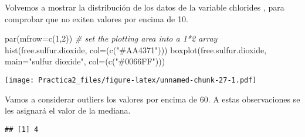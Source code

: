 \documentclass[
]{article}
\newenvironment{Shaded}{\begin{snugshade}}{\end{snugshade}}
\newcommand{\AttributeTok}[1]{\textcolor[rgb]{0.77,0.63,0.00}{#1}}
\newcommand{\CommentTok}[1]{\textcolor[rgb]{0.56,0.35,0.01}{\textit{#1}}}
\newcommand{\ConstantTok}[1]{\textcolor[rgb]{0.00,0.00,0.00}{#1}}
\newcommand{\ControlFlowTok}[1]{\textcolor[rgb]{0.13,0.29,0.53}{\textbf{#1}}}
\newcommand{\DecValTok}[1]{\textcolor[rgb]{0.00,0.00,0.81}{#1}}
\newcommand{\FunctionTok}[1]{\textcolor[rgb]{0.00,0.00,0.00}{#1}}
\newcommand{\NormalTok}[1]{#1}
\newcommand{\OtherTok}[1]{\textcolor[rgb]{0.56,0.35,0.01}{#1}}
\newcommand{\SpecialCharTok}[1]{\textcolor[rgb]{0.00,0.00,0.00}{#1}}
\newcommand{\StringTok}[1]{\textcolor[rgb]{0.31,0.60,0.02}{#1}}
\begin{document}
Volvemos a mostrar la distribución de los datos de la variable chlorides
, para comprobar que no exiten valores por encima de 10.

\begin{Shaded}
\begin{Highlighting}[]
\FunctionTok{par}\NormalTok{(}\AttributeTok{mfrow=}\FunctionTok{c}\NormalTok{(}\DecValTok{1}\NormalTok{,}\DecValTok{2}\NormalTok{))    }\CommentTok{\# set the plotting area into a 1*2 array}
\FunctionTok{hist}\NormalTok{(free.sulfur.dioxide, }\AttributeTok{col=}\NormalTok{(}\FunctionTok{c}\NormalTok{(}\StringTok{"\#AA4371"}\NormalTok{)))}
\FunctionTok{boxplot}\NormalTok{(free.sulfur.dioxide, }\AttributeTok{main=}\StringTok{"sulfur dioxide"}\NormalTok{, }\AttributeTok{col=}\NormalTok{(}\FunctionTok{c}\NormalTok{(}\StringTok{"\#0066FF"}\NormalTok{)))}
\end{Highlighting}
\end{Shaded}

\texttt{[image: Practica2\_files/figure-latex/unnamed-chunk-27-1.pdf]}

Vamos a considerar outliers los valores por encima de 60. A estas
observaciones se les asignará el valor de la mediana.

\begin{Shaded}
\end{Shaded}

\begin{verbatim}
## [1] 4
\end{verbatim}

\begin{Shaded}
\end{Shaded}
\end{document}
